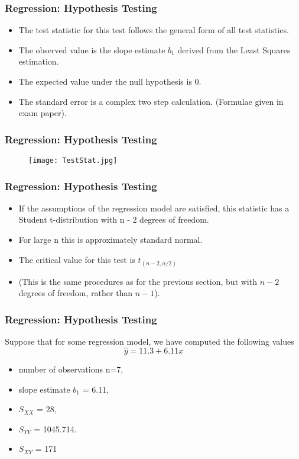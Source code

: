 \documentclass[a4]{beamer}
\begin{document}
\begin{frame}
\frametitle{Regression: Hypothesis Testing}
\begin{itemize}
\item The test statistic for this test follows the general form of all test statistics.
\item The observed value is the slope estimate $b_1$ derived from the Least Squares estimation.
\item The expected value under the null hypothesis is 0.
\item The standard error is a complex two step calculation. (Formulae given in exam paper).
\end{itemize}
\end{frame}
\begin{frame}
\frametitle{Regression: Hypothesis Testing}
\begin{figure}
  \texttt{[image: TestStat.jpg]}\\
\end{figure}
\end{frame}
\begin{frame}
\frametitle{Regression: Hypothesis Testing}
\begin{itemize}
\item If the assumptions of the regression model are satisfied, this
statistic has a Student t-distribution with n - 2 degrees of freedom.
\item For large n this is approximately standard normal.
\item The critical value for this test is $t_{(n-2,\alpha/2)}$
\item (This is the same procedures as for the previous section, but with $n-2$ degrees of freedom, rather than $n-1$).
\end{itemize}
\end{frame}
\begin{frame}
\frametitle{Regression: Hypothesis Testing}
Suppose that for some regression model, we have computed the following values
\[ \hat{y} = 11.3 + 6.11 x\]
\begin{itemize}
\item number of observations n=7,
\item slope estimate $b_1$ = 6.11,
\item $S_{XX}$ = 28,
\item $S_{YY}$ = 1045.714.
\item $S_{XY}$ = 171
\end{itemize}
\end{frame}
\end{document}
